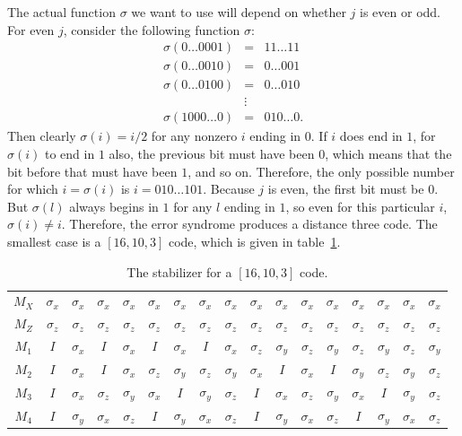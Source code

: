 \documentclass{report}
\newcommand{\X}{\sigma_x}
\newcommand{\Z}{\sigma_z}
\newcommand{\Y}{\sigma_y}
\begin{document}
The actual function $\sigma$ we want to use will depend on whether $j$ is 
even or odd.  For even $j$, consider the following function $\sigma$:
\begin{eqnarray}
\sigma (0 \ldots 0 0 0 1) & = & 1 1 \ldots 1 1  \nonumber \\
\sigma (0 \ldots 0 0 1 0) & = & 0 \ldots 0 0 1 \nonumber \\
\sigma (0 \ldots 0 1 0 0) & = & 0 \ldots 0 1 0 \label{eq-sigma-even}\\
& \vdots & \nonumber \\
\sigma (1 0 0 0 \ldots 0) & = & 0 1 0 \ldots 0. \nonumber
\end{eqnarray}
Then clearly $\sigma (i) = i/2$ for any nonzero $i$ ending in $0$.  If $i$ 
does end in $1$, for $\sigma (i)$ to end in $1$ also, the previous bit must 
have been $0$, which means that the bit before that must have been $1$, 
and so on.  Therefore, the only possible number for which $i = \sigma (i)$ 
is $i = 0 1 0 \ldots 1 0 1$.  Because $j$ is even, the first bit must be $0$.  
But $\sigma(l)$ always begins in $1$ for any $l$ ending in $1$, so even for 
this particular $i$, $\sigma (i) \neq i$.  Therefore, the error syndrome 
produces a distance three code.  The smallest case is a $[16,10,3]$ code, which 
is given in table~\ref{table-16qubit}.
\begin{table}
\centering
{\setlength{\tabcolsep}{0.4em}
\begin{tabular}{c|cccccccccccccccc}
$M_X$ & $\X$ & $\X$ & $\X$ & $\X$ & $\X$ & $\X$ & $\X$ & $\X$ & $\X$ 
& $\X$ & $\X$ & $\X$ & $\X$ & $\X$ & $\X$ & $\X$ \\
$M_Z$ & $\Z$ & $\Z$ & $\Z$ & $\Z$ & $\Z$ & $\Z$ & $\Z$ & $\Z$ & $\Z$ & 
$\Z$ & $\Z$ & $\Z$ & $\Z$ & $\Z$ & $\Z$ & $\Z$ \\
$M_1$ & $I$ & $\X$ & $I$ & $\X$ & $I$ & $\X$ & $I$ & $\X$ & $\Z$ & 
$\Y$ & $\Z$ & $\Y$ & $\Z$ & $\Y$ & $\Z$ & $\Y$ \\
$M_2$ & $I$ & $\X$ & $I$ & $\X$ & $\Z$ & $\Y$ & $\Z$ & $\Y$ & $\X$ & 
$I$ & $\X$ & $I$ & $\Y$ & $\Z$ & $\Y$ & $\Z$ \\
$M_3$ & $I$ & $\X$ & $\Z$ & $\Y$ & $\X$ & $I$ & $\Y$ & $\Z$ & $I$ & 
$\X$ & $\Z$ & $\Y$ & $\X$ & $I$ & $\Y$ & $\Z$ \\
$M_4$ & $I$ & $\Y$ & $\X$ & $\Z$ & $I$ & $\Y$ & $\X$ & $\Z$ & $I$ & 
$\Y$ & $\X$ & $\Z$ & $I$ & $\Y$ & $\X$ & $\Z$
\end{tabular}
\caption{The stabilizer for a $[16,10,3]$ code.}
\label{table-16qubit}}
\end{table}
\end{document}
